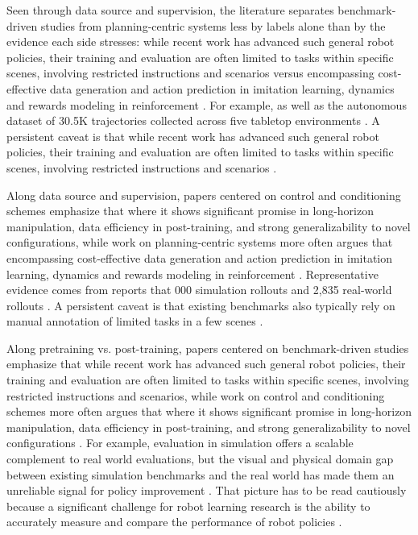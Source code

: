 \documentclass[a4paper,11pt]{article}
\begin{document}
Seen through data source and supervision, the literature separates benchmark-driven studies from planning-centric systems less by labels alone than by the evidence each side stresses: while recent work has advanced such general robot policies, their training and evaluation are often limited to tasks within specific scenes, involving restricted instructions and scenarios versus encompassing cost-effective data generation and action prediction in imitation learning, dynamics and rewards modeling in reinforcement \citep{Dai2025Manitaskgen,Jain2025Polaris,Mei2026Video}. For example, as well as the autonomous dataset of 30.5K trajectories collected across five tabletop environments \citep{Zhou2024Autonomous}. A persistent caveat is that while recent work has advanced such general robot policies, their training and evaluation are often limited to tasks within specific scenes, involving restricted instructions and scenarios \citep{Dai2025Manitaskgen}.

Along data source and supervision, papers centered on control and conditioning schemes emphasize that where it shows significant promise in long-horizon manipulation, data efficiency in post-training, and strong generalizability to novel configurations, while work on planning-centric systems more often argues that encompassing cost-effective data generation and action prediction in imitation learning, dynamics and rewards modeling in reinforcement \citep{Li2026Causal,Jlg2025Robot,Mei2026Video}. Representative evidence comes from reports that 000 simulation rollouts and 2,835 real-world rollouts \citep{Lin2026Systematic}. A persistent caveat is that existing benchmarks also typically rely on manual annotation of limited tasks in a few scenes \citep{Dai2025Manitaskgen}.

Along pretraining vs. post-training, papers centered on benchmark-driven studies emphasize that while recent work has advanced such general robot policies, their training and evaluation are often limited to tasks within specific scenes, involving restricted instructions and scenarios, while work on control and conditioning schemes more often argues that where it shows significant promise in long-horizon manipulation, data efficiency in post-training, and strong generalizability to novel configurations \citep{Dai2025Manitaskgen,Jain2025Polaris,Li2026Causal,Jlg2025Robot}. For example, evaluation in simulation offers a scalable complement to real world evaluations, but the visual and physical domain gap between existing simulation benchmarks and the real world has made them an unreliable signal for policy improvement \citep{Jain2025Polaris}. That picture has to be read cautiously because a significant challenge for robot learning research is the ability to accurately measure and compare the performance of robot policies \citep{Jain2025Polaris}.
\end{document}
